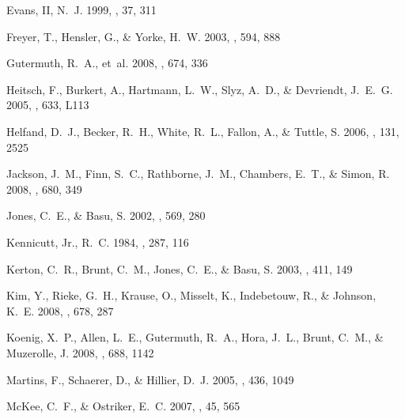 \begin{thebibliography}{39}
{Evans}, II, N.~J. 1999, \araa, 37, 311

{Freyer}, T., {Hensler}, G., \& {Yorke}, H.~W. 2003, \apj, 594, 888

{Gutermuth}, R.~A., {et~al.} 2008, \apj, 674, 336

{Heitsch}, F., {Burkert}, A., {Hartmann}, L.~W., {Slyz}, A.~D., \& {Devriendt},
  J.~E.~G. 2005, \apjl, 633, L113

{Helfand}, D.~J., {Becker}, R.~H., {White}, R.~L., {Fallon}, A., \& {Tuttle},
  S. 2006, \aj, 131, 2525

{Jackson}, J.~M., {Finn}, S.~C., {Rathborne}, J.~M., {Chambers}, E.~T., \&
  {Simon}, R. 2008, \apj, 680, 349

{Jones}, C.~E., \& {Basu}, S. 2002, \apj, 569, 280

{Kennicutt}, Jr., R.~C. 1984, \apj, 287, 116

{Kerton}, C.~R., {Brunt}, C.~M., {Jones}, C.~E., \& {Basu}, S. 2003, \aap, 411,
  149

{Kim}, Y., {Rieke}, G.~H., {Krause}, O., {Misselt}, K., {Indebetouw}, R., \&
  {Johnson}, K.~E. 2008, \apj, 678, 287

{Koenig}, X.~P., {Allen}, L.~E., {Gutermuth}, R.~A., {Hora}, J.~L., {Brunt},
  C.~M., \& {Muzerolle}, J. 2008, \apj, 688, 1142

{Martins}, F., {Schaerer}, D., \& {Hillier}, D.~J. 2005, \aap, 436, 1049

{McKee}, C.~F., \& {Ostriker}, E.~C. 2007, \araa, 45, 565


\end{thebibliography}

